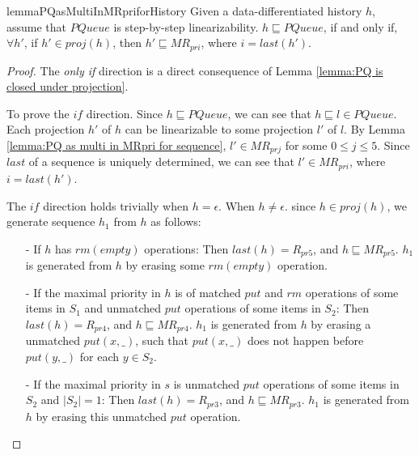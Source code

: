 \begin{restatable}{lemma}{PQasMultiInMRpriforHistory}
\label{lemma:PQ as multi in MRpri for history}
Given a data-differentiated history $h$, assume that $\textit{PQueue}$ is step-by-step linearizability. $h \sqsubseteq \textit{PQueue}$, if and only if, $\forall h'$, if $h' \in \textit{proj}(h)$, then $h' \sqsubseteq \textit{MR}_{\textit{pri}}$, where $i = \textit{last}(h')$.
\end{restatable}

\begin {proof}

The \textit{only if} direction is a direct consequence of Lemma \ref{lemma:PQ is closed under projection}.

To prove the $\textit{if}$ direction. Since $h \sqsubseteq \textit{PQueue}$, we can see that $h \sqsubseteq l \in \textit{PQueue}$. Each projection $h'$ of $h$ can be linearizable to some projection $l'$ of $l$. By Lemma \ref{lemma:PQ as multi in MRpri for sequence}, $l' \in \textit{MR}_{\textit{prj}}$ for some $0 \leq j \leq 5$. Since $\textit{last}$ of a sequence is uniquely determined, we can see that $l' \in \textit{MR}_{\textit{pri}}$, where $i = \textit{last}(h')$.


The $\textit{if}$ direction holds trivially when $h = \epsilon$. When $h \neq \epsilon$. since $h \in \textit{proj}(h)$, we generate sequence $h_1$ from $h$ as follows:

\begin{itemize}
\setlength{\itemsep}{0.5pt}
\item[-] If $h$ has $\textit{rm}(\textit{empty})$ operations: Then $\textit{last}(h) = R_{\textit{pr5}}$, and $h \sqsubseteq \textit{MR}_{\textit{pr5}}$. $h_1$ is generated from $h$ by erasing some $\textit{rm}(\textit{empty})$ operation.

\item[-] If the maximal priority in $h$ is of matched $\textit{put}$ and $\textit{rm}$ operations of some items in $S_1$ and unmatched $\textit{put}$ operations of some items in $S_2$: Then $\textit{last}(h) = R_{\textit{pr4}}$, and $h \sqsubseteq \textit{MR}_{\textit{pr4}}$. $h_1$ is generated from $h$ by erasing a unmatched $\textit{put}(x,\_)$, such that $\textit{put}(x,\_)$ does not happen before $\textit{put}(y,\_)$ for each $y \in S_2$.

\item[-] If the maximal priority in $s$ is unmatched $\textit{put}$ operations of some items in $S_2$ and $\vert S_2 \vert =1$: Then $\textit{last}(h) = R_{\textit{pr3}}$, and $h \sqsubseteq \textit{MR}_{\textit{pr3}}$. $h_1$ is generated from $h$ by erasing this unmatched $\textit{put}$ operation.


\end{itemize}
\end{proof}
